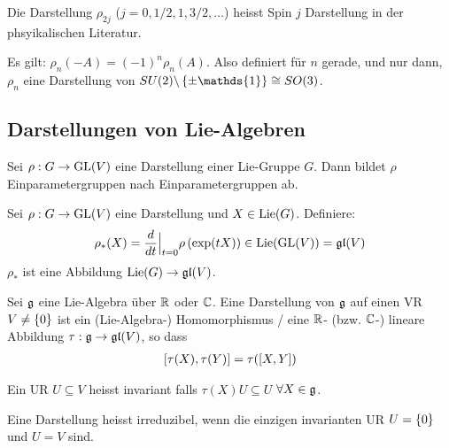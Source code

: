 \begin{bemerkung}
    Die Darstellung $\rho_{2j}$ ($j=0,1/2,1,3/2,\dots$) heisst Spin $j$
    Darstellung in der phsyikalischen Literatur.
\end{bemerkung}

\begin{bemerkung}
    Es gilt: $\rho_n (-A) = (-1)^n \rho_n (A)$. Also definiert für $n$
    gerade, und nur dann, $\rho_n$ eine Darstellung von $SU(2) \backslash
    \geschwungeneklammer{\pm \mathds{1}} \cong SO(3)$.
\end{bemerkung}

\subsection{Darstellungen von Lie-Algebren}

\begin{lemma}
    Sei $\rho: G \rightarrow \text{GL}(V)$ eine Darstellung einer Lie-Gruppe $G$.
    Dann bildet $\rho$ Einparametergruppen nach Einparametergruppen ab.
\end{lemma}

\begin{definition}
    Sei $\rho: G \rightarrow \text{GL}(V)$ eine Darstellung und $X \in \text{Lie}(G)$.
    Definiere:
    \begin{align*}
        \rho_\ast (X) = \frac{d}{dt} \Big|_{t=0} \rho \left( \exp(t X) \right)
        \in \text{Lie} (\text{GL}(V)) = \mathfrak{gl}(V)
    \end{align*}
    $\rho_\ast$ ist eine Abbildung $\text{Lie}(G) \rightarrow \mathfrak{gl}(V)$.
\end{definition}

\begin{definition}
    Sei $\mathfrak{g}$ eine Lie-Algebra über $\mathbb{R}$ oder $\mathbb{C}$. Eine Darstellung
    von $\mathfrak{g}$ auf einen VR $V \neq \left\{ 0 \right\}$ ist ein
    (Lie-Algebra-) Homomorphismus / eine $\mathbb{R}$- (bzw. $\mathbb{C}$-) lineare Abbildung
    $\tau: \mathfrak{g} \rightarrow \mathfrak{gl}(V)$, so dass
    \begin{align*}
        \left[ \tau(X),\tau(Y) \right]  = \tau(\left[ X,Y \right])
    \end{align*}
\end{definition}

\begin{definition}[Invariant]
    Ein UR $U \subseteq V$ heisst invariant falls $\tau(X) U \subseteq U$
    $\forall X \in \mathfrak{g}$.
\end{definition}

\begin{definition}[Irreduzibel]
    Eine Darstellung heisst irreduzibel, wenn die einzigen invarianten
    UR $U = \left\{ 0 \right\}$ und $U=V$ sind.
\end{definition}

